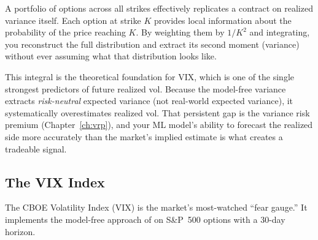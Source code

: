 \begin{intuition}
A portfolio of options across all strikes effectively replicates a contract on realized variance itself.
Each option at strike $K$ provides local information about the probability of the price reaching $K$.
By weighting them by $1/K^2$ and integrating, you reconstruct the full distribution and extract its second moment (variance) without ever assuming what that distribution looks like.
\end{intuition}

\begin{projectconnection}
This integral is the theoretical foundation for VIX, which is one of the single strongest predictors of future realized vol.
Because the model-free variance extracts \emph{risk-neutral} expected variance (not real-world expected variance), it systematically overestimates realized vol.
That persistent gap is the variance risk premium (Chapter~\ref{ch:vrp}), and your ML model's ability to forecast the realized side more accurately than the market's implied estimate is what creates a tradeable signal.
\end{projectconnection}

\subsection{The VIX Index}
\label{sec:vix-index}

The CBOE Volatility Index (VIX) is the market's most-watched ``fear gauge.''
It implements the model-free approach of \citet{BrittenJones2000} on S\&P~500 options with a 30-day horizon.

